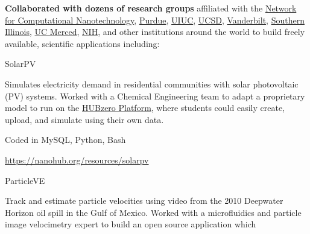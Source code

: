 \documentclass[10pt]{article}
\newcommand\HUBZEROPLATFORM{\href{https://hubzero.org}{HUBzero Platform}}
\begin{document}
\begin{innerlist}
            \item \textbf{Collaborated with dozens of research groups} affiliated with the
                \href{https://nanohub.org/groups/ncn}{Network for Computational Nanotechnology},
                \href{https://engineering.purdue.edu/ChE/People/ptProfile?id=12436}{Purdue},
                \href{http://nanobionode.illinois.edu}{UIUC},
                \href{http://pegasus.isi.edu}{UCSD},
                \href{http://telab.vuse.vanderbilt.edu/greg.walker}{Vanderbilt},
                \href{http://www.engr.siu.edu/staff1/ahmed/mywebpage/ahmed.html}{Southern Illinois},
                \href{http://faculty1.ucmerced.edu/amartini}{UC Merced},
                \href{http://cbiit.nci.nih.gov/ncip}{NIH},
                and other institutions around the world to build freely available,
                scientific applications including:
                \begin{outerlist}
                    \item[] SolarPV
                        \begin{innerlist}
                            \item[] Simulates electricity demand in residential
                              communities with solar photovoltaic (PV) systems.
                              Worked with a Chemical Engineering team to adapt
                              a proprietary model to run on the \HUBZEROPLATFORM,
                              where students could easily create,
                              upload, and simulate using their own data.
                            \item[] Coded in MySQL, Python, Bash
                            \item[] \url{https://nanohub.org/resources/solarpv} \hfill{}
                        \end{innerlist}
                    \item[] ParticleVE
                        \begin{innerlist}
                            \item[] Track and estimate particle velocities
                              using video from the 2010 Deepwater Horizon
                              oil spill in the Gulf of Mexico. Worked with
                              a microfluidics and particle image velocimetry
                              expert to build an open source application which

\end{innerlist}
\end{outerlist}
\end{innerlist}
\end{document}
